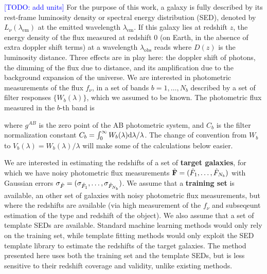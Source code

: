 \documentclass[aps,prd,showpacs,superscriptaddress,groupedaddress]{revtex4}  %
\newcommand{\todo}[1]{\textcolor{blue}{[TODO: #1]}}
\begin{document}
\todo{add units}
For the purpose of this work, a galaxy is fully described by its rest-frame luminosity density or spectral energy distribution (SED), denoted by $L_\nu(\lambda_\mathrm{em})$ at the emitted wavelength $\lambda_\mathrm{em}$.
If this galaxy lies at redshift $z$, the energy density of the flux measured at redshift $0$ (\eg on Earth, in the absence of extra doppler shift terms) at a wavelength $\lambda_\mathrm{obs}$ reads
where $D(z)$ is the luminosity distance. 
Three effects are in play here: the doppler shift of photons, the dimming of the flux due to distance, and its amplification due to the background expansion of the universe. 
We are interested in photometric measurements of the flux $f_\nu$, in a  set of bands $b=1, \dots, N_b$ described by a set of filter responses $\{ W_b(\lambda) \}$, which we assumed to be known.
The photometric flux measured in the $b$-th band is

where $g^{AB}$ is the zero point of the AB photometric system, and $C_b$ is the filter normalization constant $C_b = \int_0^\infty W_b(\lambda) \mathrm{d}\lambda / \lambda$. The change of convention from $W_b$ to  $V_b(\lambda) = W_b(\lambda)/\lambda$ will make some of the calculations below easier.

We are interested in estimating the redshifts of a set of {\bf target galaxies}, for which we have noisy photometric flux measurements $\hat{\mat{F}}=(\hat{F}_1, \dots, \hat{F}_{N_b})$ with Gaussian errors ${\bf \sigma}_{\hat{F}}=(\sigma_{\hat{F}_1}, \dots, \sigma_{\hat{F}_{N_b}})$. 
We assume that a {\bf training set} is available, \ie an other set of galaxies with noisy photometric flux measurements, but where the redshifts are available (\eg via high measurement of the $f_\nu$ and subseqeunt estimation of the type and redshift of the object). 
We also assume that a set of template SEDs are available.
Standard machine learning methods would only rely on the training set, while template fitting methods would only exploit the SED template library to estimate the redshifts of the target galaxies.
The method presented here uses both the training set and the template SEDs, but is less sensitive to their redshift coverage and validity, unlike existing methods.
\end{document}

